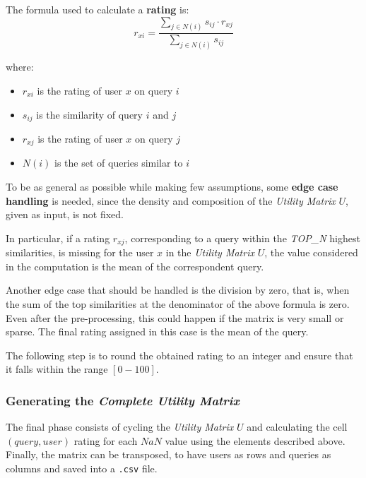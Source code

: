 The formula used to calculate a \textbf{rating} is: 
$$r_{xi} = \frac{\sum_{j\in N(i)} s_{ij} \cdot r_{xj}  }{\sum_{j\in N(i)} s_{ij}}$$

where:
\begin{itemize}
    \item $r_{xi}$ is the rating of user $x$ on query $i$
    \item $s_{ij}$ is the similarity of query $i$ and $j$
    \item $r_{xj}$ is the rating of user $x$ on query $j$
    \item $N(i)$ is the set of queries similar to $i$
\end{itemize}


To be as general as possible while making  few assumptions, some \textbf{edge case handling} is needed, since the density and composition of the \textit{Utility Matrix} $U$, given as input, is not fixed.

In particular, if a rating $r_{xj}$, corresponding to a query within the \textit{TOP\_N} highest similarities, is missing for the user $x$ in the \textit{Utility Matrix} $U$, the value considered in the computation is the mean of the correspondent query.

Another edge case that should be handled is the division by zero, that is, when the sum of the top similarities at the denominator of the above formula is zero. Even after the pre-processing, this could happen if the matrix is very small or sparse.
The final rating assigned in this case is the mean of the query.

The following step is to round the obtained rating to an integer and ensure that it falls within the range $[0-100]$.

\subsubsection{Generating the \textit{Complete Utility Matrix}}

The final phase consists of cycling the \textit{Utility Matrix} $U$ and calculating the cell\\ $(query, user)$ rating for each $NaN$ value using the elements described above.
Finally, the matrix can be transposed, to have users as rows and queries as columns and saved into a \verb+.csv+ file.













